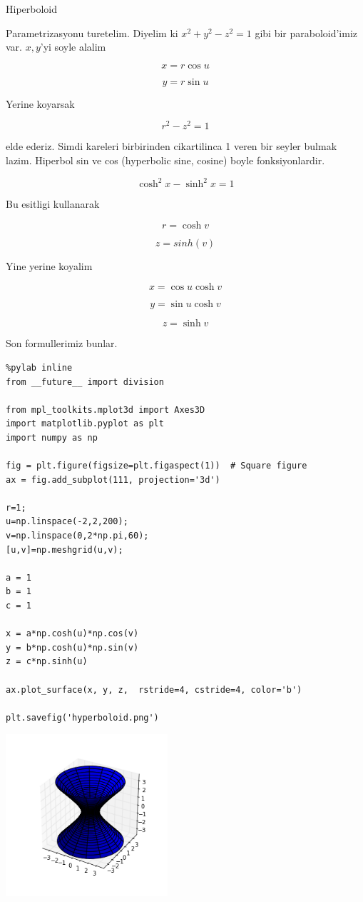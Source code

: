 \documentclass[12pt,fleqn]{article}\usepackage{../common}
\begin{document}
Hiperboloid 

Parametrizasyonu turetelim. Diyelim ki $x^2 + y^2 - z^2 = 1$ gibi bir
paraboloid'imiz var. $x,y$'yi soyle alalim

\[ x = r \cos u \]

\[ y = r \sin u \]

Yerine koyarsak

\[ r^2 - z^2 = 1 \]

elde ederiz. Simdi kareleri birbirinden cikartilinca 1 veren bir seyler
bulmak lazim. Hiperbol sin ve cos (hyperbolic sine, cosine) boyle
fonksiyonlardir. 

\[ \cosh^2x - \sinh^2x = 1 \]

Bu esitligi kullanarak 

\[ r = \cosh v \]

\[ z = sinh(v) \]

Yine yerine koyalim

\[ x = \cos u \cosh v \]

\[ y = \sin u \cosh v \]

\[ z = \sinh v \]

Son formullerimiz bunlar.

\begin{verbatim}
%pylab inline
from __future__ import division

from mpl_toolkits.mplot3d import Axes3D
import matplotlib.pyplot as plt
import numpy as np

fig = plt.figure(figsize=plt.figaspect(1))  # Square figure
ax = fig.add_subplot(111, projection='3d')

r=1;
u=np.linspace(-2,2,200);
v=np.linspace(0,2*np.pi,60);
[u,v]=np.meshgrid(u,v);

a = 1
b = 1
c = 1

x = a*np.cosh(u)*np.cos(v)
y = b*np.cosh(u)*np.sin(v)
z = c*np.sinh(u)

ax.plot_surface(x, y, z,  rstride=4, cstride=4, color='b')

plt.savefig('hyperboloid.png')
\end{verbatim}

\includegraphics[height=6cm]{hyperboloid.png}
\end{document}
